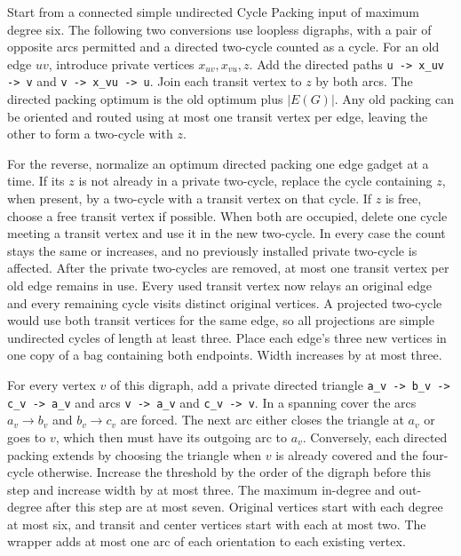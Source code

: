\documentclass[11pt]{article}
\begin{document}
Start from a connected simple undirected Cycle Packing input of maximum degree six. The following two conversions use loopless digraphs, with a pair of opposite arcs permitted and a directed two-cycle counted as a cycle. For an old edge \(uv\), introduce private vertices \(x_{uv},x_{vu},z\). Add the directed paths \texttt{u -> x\_uv -> v} and \texttt{v -> x\_vu -> u}. Join each transit vertex to \(z\) by both arcs. The directed packing optimum is the old optimum plus \(|E(G)|\). Any old packing can be oriented and routed using at most one transit vertex per edge, leaving the other to form a two-cycle with \(z\).

For the reverse, normalize an optimum directed packing one edge gadget at a time. If its \(z\) is not already in a private two-cycle, replace the cycle containing \(z\), when present, by a two-cycle with a transit vertex on that cycle. If \(z\) is free, choose a free transit vertex if possible. When both are occupied, delete one cycle meeting a transit vertex and use it in the new two-cycle. In every case the count stays the same or increases, and no previously installed private two-cycle is affected. After the private two-cycles are removed, at most one transit vertex per old edge remains in use. Every used transit vertex now relays an original edge and every remaining cycle visits distinct original vertices. A projected two-cycle would use both transit vertices for the same edge, so all projections are simple undirected cycles of length at least three. Place each edge's three new vertices in one copy of a bag containing both endpoints. Width increases by at most three.

For every vertex \(v\) of this digraph, add a private directed triangle \texttt{a\_v -> b\_v -> c\_v -> a\_v} and arcs \texttt{v -> a\_v} and \texttt{c\_v -> v}. In a spanning cover the arcs $a_v\to b_v$ and $b_v\to c_v$ are forced. The next arc either closes the triangle at $a_v$ or goes to $v$, which then must have its outgoing arc to $a_v$. Conversely, each directed packing extends by choosing the triangle when $v$ is already covered and the four-cycle otherwise. Increase the threshold by the order of the digraph before this step and increase width by at most three. The maximum in-degree and out-degree after this step are at most seven. Original vertices start with each degree at most six, and transit and center vertices start with each at most two. The wrapper adds at most one arc of each orientation to each existing vertex.
\end{document}
